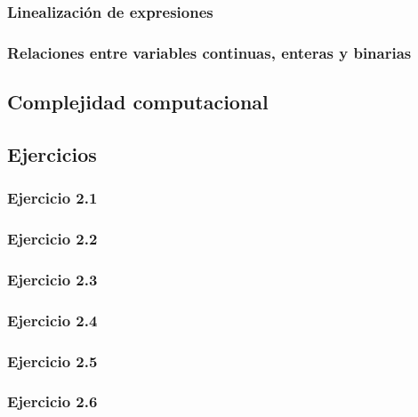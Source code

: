 \subsubsection{Linealización de expresiones}

\subsubsection{Relaciones entre variables continuas, enteras y binarias}

\subsection{Complejidad computacional}

\subsection{Ejercicios}

\subsubsection{Ejercicio 2.1}


\subsubsection{Ejercicio 2.2}


\subsubsection{Ejercicio 2.3}


\subsubsection{Ejercicio 2.4}


\subsubsection{Ejercicio 2.5}


\subsubsection{Ejercicio 2.6}


